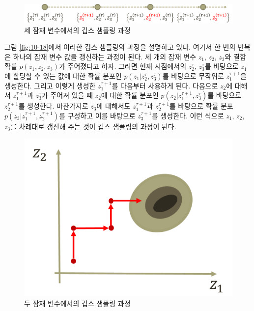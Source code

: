 \documentclass[a4paper]{oblivoir}
\begin{document}
\begin{figure}[ht] \centering 
\includegraphics[scale=0.5]{fig10_13.png} 
\caption{세 잠재 변수에서의 깁스 샘플링 과정}
\label{fig:10-14}
\end{figure}

그림 \ref{fig:10-18}에서 이러한 깁스 샘플링의 과정을 설명하고 있다. 여기서 한 번의 반복은 하나의 잠재 변수 값을 갱신하는 과정이 된다. 세 개의 잠재 변수 $z_1$, $z_2$, $z_3$와 결합 확률 $p(z_1, z_2, z_3)$가 주어졌다고 하자. 그러면 현재 시점에서의 $z_2^{\tau}$, $z_3^{\tau}$를 바탕으로 $z_1$에 할당할 수 있는 값에 대한 확률 분포인 $p(z_1 | z_2^{\tau}, z_3^{\tau})$를 바탕으로 무작위로 $z_1^{\tau+1}$을 생성한다. 그리고 이렇게 생성한 $z_1^{\tau+1}$를 다음부터 사용하게 된다. 다음으로 $z_2$에 대해서 $z_1^{\tau+1}$과 $z_3^{\tau}$가 주어져 있을 때 $z_2$에 대한 확률 분포인 $p(z_2 | z_1^{\tau+1}, z_3^{\tau})$를 바탕으로 $z_2^{\tau+1}$를 생성한다. 마찬가지로 $z_3$에 대해서도 $z_1^{\tau+1}$과 $z_2^{\tau+1}$를 바탕으로 확률 분포 $p(z_3 | z_1^{\tau+1}, z_2^{\tau+1})$를 구성하고 이를 바탕으로 $z_3^{\tau+1}$를 생성한다. 이런 식으로 $z_1$, $z_2$, $z_3$를 차례대로 갱신해 주는 것이 깁스 샘플링의 과정이 된다.\\

\begin{figure}[ht] \centering 
\includegraphics[scale=0.8]{fig10_14.png} 
\caption{두 잠재 변수에서의 깁스 샘플링 과정}
\label{fig:10-15}
\end{figure}
\end{document}
